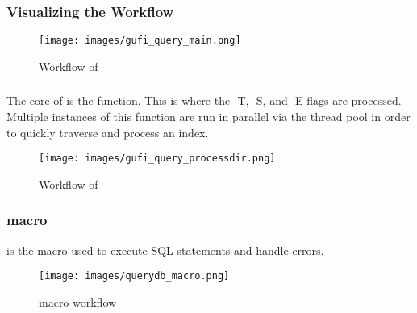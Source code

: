 \subsubsection{Visualizing the Workflow}
\begin{figure}[h!]
  \centering
  \texttt{[image: images/gufi\_query\_main.png]}
  \caption{Workflow of \gufiquery}
\end{figure}

\subsubsection{\processdir}
The core of \gufiquery is the \processdir function. This is where the
-T, -S, and -E flags are processed. Multiple instances of this
function are run in parallel via the thread pool in order to quickly
traverse and process an index.

\begin{figure}[h!]
  \centering
  \texttt{[image: images/gufi\_query\_processdir.png]}
  \caption{Workflow of \processdir}
\end{figure}

\subsubsection{\querydb macro}
\querydb is the macro used to execute SQL statements and handle errors.

\begin{figure}[h!]
  \centering
  \texttt{[image: images/querydb\_macro.png]}
  \caption{\querydb macro workflow}
\end{figure}
